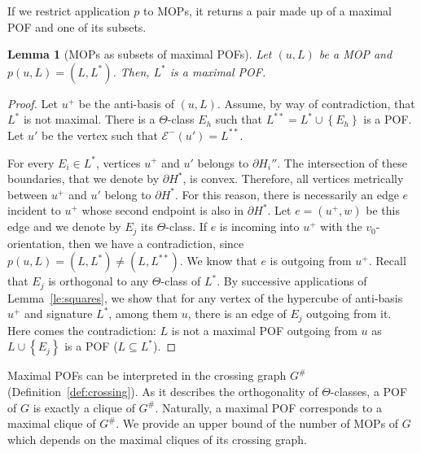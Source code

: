 \documentclass{article}
\newtheorem{lemma}{Lemma}
\newcommand{\set}[1]{\left\{ #1 \right\}}
\begin{document}
If we restrict application $p$ to MOPs, it returns a pair made up of a maximal POF and one of its subsets.

\begin{lemma}[MOPs as subsets of maximal POFs]
Let $(u,L)$ be a MOP and $p(u,L) = (L,L^*)$. Then, $L^*$ is a maximal POF.
\end{lemma}
\begin{proof}
Let $u^+$ be the anti-basis of $(u,L)$. 
Assume, by way of contradiction, that $L^*$ is not maximal. There is a $\Theta$-class $E_h$ such that $L^{**} = L^* \cup \set{E_h}$ is a POF. Let $u'$ be the vertex such that $\mathcal{E}^-(u') = L^{**}$.

For every $E_i \in L^*$, vertices $u^+$ and $u'$ belongs to $\partial H_i''$. The intersection of these boundaries, that we denote by $\partial H^*$, is convex. Therefore, all vertices metrically between $u^+$ and $u'$ belong to $\partial H^*$. For this reason, there is necessarily an edge $e$ incident to $u^+$ whose second endpoint is also in $\partial H^*$. Let $e=(u^+,w)$ be this edge and we denote by $E_j$ its $\Theta$-class. If $e$ is incoming into $u^+$ with the $v_0$-orientation, then we have a contradiction, since $p(u,L) = (L,L^*) \neq (L,L^{**})$. We know that $e$ is outgoing from $u^+$. Recall that $E_j$ is orthogonal to any $\Theta$-class of $L^*$. By successive applications of Lemma~\ref{le:squares}, we show that for any vertex of the hypercube of anti-basis $u^+$ and signature $L^*$, among them $u$, there is an edge of $E_j$ outgoing from it. Here comes the contradiction: $L$ is not a maximal POF outgoing from $u$ as $L \cup \set{E_j}$ is a POF ($L \subseteq L^*$).
\end{proof}

Maximal POFs can be interpreted in the crossing graph $G^{\#}$ (Definition~\ref{def:crossing}). As it describes the orthogonality of $\Theta$-classes, a POF of $G$ is exactly a clique of $G^{\#}$. Naturally, a maximal POF corresponds to a maximal clique of $G^{\#}$. We provide an upper bound of the number of MOPs of $G$ which depends on the maximal cliques of its crossing graph.
\end{document}
